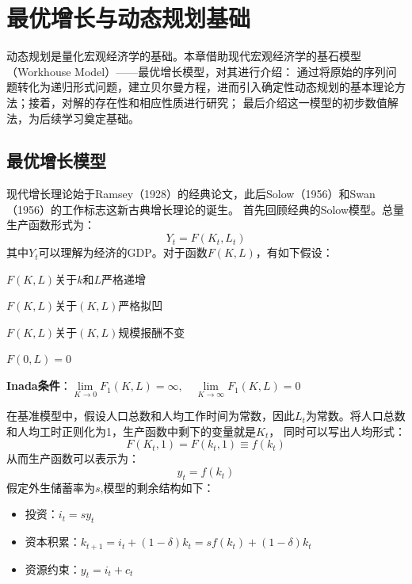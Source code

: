 

\chapter{最优增长与动态规划基础} \label{ch-ngm-dp}

动态规划是量化宏观经济学的基础。本章借助现代宏观经济学的基石模型（Workhouse Model）——最优增长模型，对其进行介绍：
通过将原始的序列问题转化为递归形式问题，建立贝尔曼方程，进而引入确定性动态规划的基本理论方法；接着，对解的存在性和相应性质进行研究；
最后介绍这一模型的初步数值解法，为后续学习奠定基础。


\section{最优增长模型} \label{sec-ngm}

现代增长理论始于Ramsey（1928）的经典论文，此后Solow（1956）和Swan（1956）的工作标志这新古典增长理论的诞生。
首先回顾经典的Solow模型。总量生产函数形式为：
\begin{equation*}
    Y_t = F\left(K_t, L_t\right)
\end{equation*}
其中$Y_t$可以理解为经济的GDP。对于函数$F(K, L)$，有如下假设：
\begin{assumption}  \label{as-F-increase}
    $F(K, L)$关于$k$和$L$严格递增
\end{assumption}
\begin{assumption}  \label{as-F-quasiconcave}
    $F(K, L)$关于$(K, L)$严格拟凹
\end{assumption}
\begin{assumption}  \label{as-F-cosntant}
    $F(K, L)$关于$(K, L)$规模报酬不变
\end{assumption}
\begin{assumption}  \label{as-F-zero}
    $F(0, L)=0$
\end{assumption}
\begin{assumption}  \label{as-F-inada}
    \textbf{Inada条件}：$\lim\limits_{K\rightarrow 0}F_1(K, L)=\infty, \quad \lim\limits_{K\rightarrow \infty}F_1(K, L)=0$
\end{assumption}

在基准模型中，假设人口总数和人均工作时间为常数，因此$L_t$为常数。将人口总数和人均工时正则化为1，生产函数中剩下的变量就是$K_t$，
同时可以写出人均形式：
\begin{equation*}
    F(K_t, 1)=F(k_t, 1)\equiv f(k_t)
\end{equation*}
从而生产函数可以表示为：
\begin{equation}
    y_t = f(k_t)
\end{equation}
假定外生储蓄率为$s$,模型的剩余结构如下：
\begin{itemize}
    \item 投资：$i_t = sy_t$
    \item 资本积累：$k_{t+1}=i_t+(1-\delta)k_t = sf(k_t)+(1-\delta)k_t$
    \item 资源约束：$y_t = i_t + c_t$
\end{itemize}

